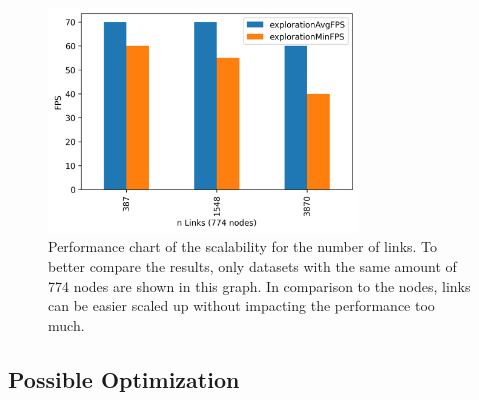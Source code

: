 \begin{figure}[!bt]
    \centering
    \includegraphics[width=0.73\textwidth]{graphics/performanceAnalysisLinks3.png}
    \caption[Performance chart of the scalability for the number of links.]{Performance chart of the scalability for the number of links. To better compare the results, only datasets with the same amount of 774 nodes are shown in this graph. In comparison to the nodes, links can be easier scaled up without impacting the performance too much.} 
    \label{fig:performanceLinks} 
\end{figure}
\pagebreak

\subsection{Possible Optimization}

